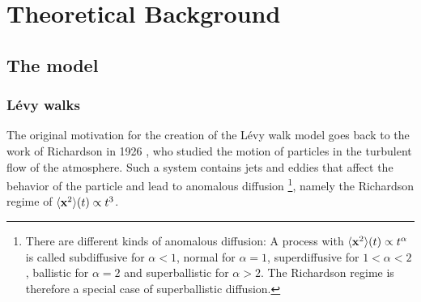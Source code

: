 \chapter{Theoretical Background}

\section{The model}

\subsection{L\'evy walks}

The original motivation for the creation of the L\'evy walk model goes back to the work of Richardson in 1926 \cite{richardson}, who studied the motion of particles in the turbulent flow of the atmosphere. Such a system contains jets and eddies that affect the behavior of the particle and lead to anomalous diffusion
\footnote{There are different kinds of anomalous diffusion: A process with $\langle \mathbf{ x }^2 \rangle(t) \propto t^{\alpha}$ is called subdiffusive for $\alpha<1$, normal for $\alpha = 1$, superdiffusive for $1<\alpha<2$, ballistic for $\alpha=2$ and superballistic for $\alpha > 2 $. The Richardson regime is therefore a special case of superballistic diffusion.}, 
namely the Richardson regime of $\langle \mathbf{ x }^2 \rangle(t) \propto t^3 $.

